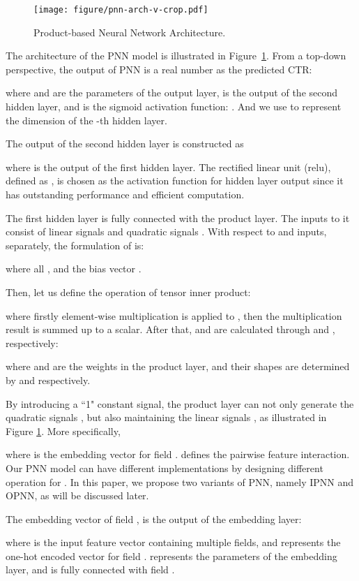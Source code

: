 \documentclass[conference]{IEEEtran}
\begin{document}
\begin{figure}[t]
	\centering
	\texttt{[image: figure/pnn-arch-v-crop.pdf]}
	\caption{Product-based Neural Network Architecture.}\label{fig:pnn}
\end{figure}

The architecture of the PNN model is illustrated in Figure~\ref{fig:pnn}.
From a top-down perspective, the output of PNN is a real number  as the predicted CTR:

where  and  are the parameters of the output layer,  is the output of the second hidden layer, and  is the sigmoid activation function: . And we use  to represent the dimension of the -th hidden layer.

The output  of the second hidden layer is constructed as

where  is the output of the first hidden layer. The rectified linear unit (relu), defined as , is chosen as the activation function for hidden layer output since it has outstanding performance and efficient computation.


The first hidden layer is fully connected with the product layer. The inputs to it consist of linear signals  and quadratic signals . With respect to  and  inputs, separately, the formulation of  is:

where all ,  and the bias vector .

Then, let us define the operation of tensor inner product:

where firstly element-wise multiplication is applied to , then the multiplication result is summed up to a scalar. After that,
 and  are calculated through  and , respectively:

where  and  are the weights in the product layer, and their shapes are determined by  and  respectively.

By introducing a ``1" constant signal, the product layer can not only generate the quadratic signals , but also maintaining the linear signals , as illustrated in Figure \ref{fig:pnn}. More specifically,

where  is the embedding vector for field .  defines the pairwise feature interaction.
Our PNN model can have different implementations by designing different operation for . In this paper, we propose two variants of PNN, namely IPNN and OPNN, as will be discussed later.

The embedding vector  of field , is the output of the embedding layer:

where  is the input feature vector containing multiple fields, and  represents the one-hot encoded vector for field .  represents the parameters of the embedding layer, and  is fully connected with field .
\end{document}
